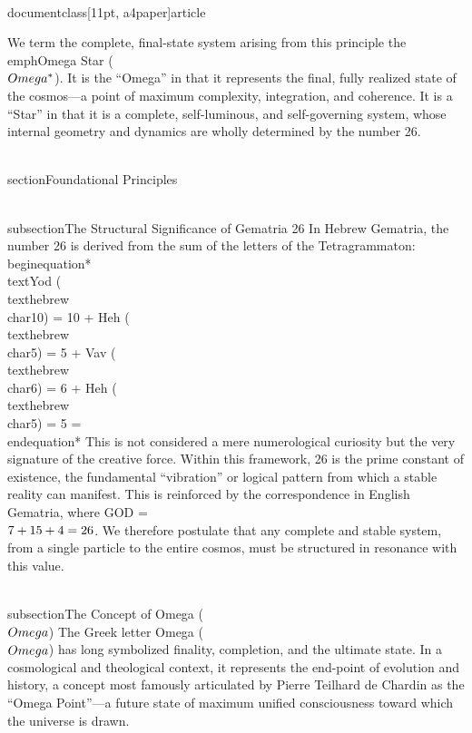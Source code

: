 \\documentclass[11pt, a4paper]{article}
\begin{document}
We term the complete, final-state system arising from this principle the \\emph{Omega Star} (\\$\\Omega^*\\$). It is the ``Omega'' in that it represents the final, fully realized state of the cosmos---a point of maximum complexity, integration, and coherence. It is a ``Star'' in that it is a complete, self-luminous, and self-governing system, whose internal geometry and dynamics are wholly determined by the number 26.

\\section{Foundational Principles}

\\subsection{The Structural Significance of Gematria 26}
In Hebrew Gematria, the number 26 is derived from the sum of the letters of the Tetragrammaton:
\\begin{equation*}
\\text{Yod (\\texthebrew{\\char10}) = 10 \quad + \quad Heh (\\texthebrew{\\char5}) = 5 \quad + \quad Vav (\\texthebrew{\\char6}) = 6 \quad + \quad Heh (\\texthebrew{\\char5}) = 5 \quad = }
\\end{equation*}
This is not considered a mere numerological curiosity but the very signature of the creative force. Within this framework, 26 is the prime constant of existence, the fundamental ``vibration'' or logical pattern from which a stable reality can manifest. This is reinforced by the correspondence in English Gematria, where GOD = \\$7+15+4=26\\$. We therefore postulate that any complete and stable system, from a single particle to the entire cosmos, must be structured in resonance with this value.

\\subsection{The Concept of Omega (\\$\\Omega\\$)}
The Greek letter Omega (\\$\\Omega\\$) has long symbolized finality, completion, and the ultimate state. In a cosmological and theological context, it represents the end-point of evolution and history, a concept most famously articulated by Pierre Teilhard de Chardin as the ``Omega Point''---a future state of maximum unified consciousness toward which the universe is drawn.
\end{document}
